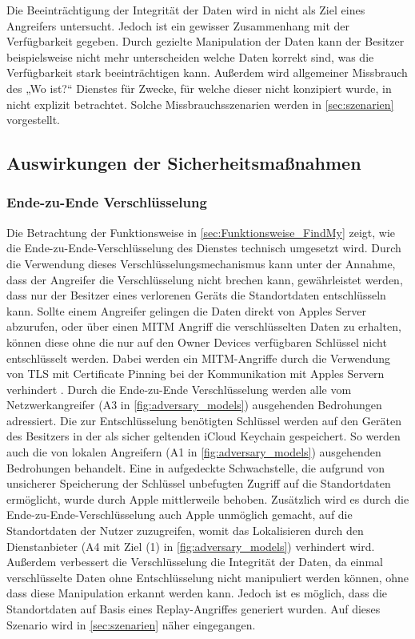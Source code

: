 Die Beeinträchtigung der Integrität der Daten wird in \cite{Heinrich_FindMy} nicht als Ziel eines Angreifers untersucht.
Jedoch ist ein gewisser Zusammenhang mit der Verfügbarkeit gegeben.
Durch gezielte Manipulation der Daten kann der Besitzer beispielsweise nicht mehr unterscheiden welche Daten korrekt sind, was die Verfügbarkeit stark beeinträchtigen kann.
Außerdem wird allgemeiner Missbrauch des „Wo ist?“ Dienstes für Zwecke, für welche dieser nicht konzipiert wurde, in \cite{Heinrich_FindMy} nicht explizit betrachtet.
Solche Missbrauchsszenarien werden in \autoref{sec:szenarien} vorgestellt.


\subsection{Auswirkungen der Sicherheitsmaßnahmen}

\subsubsection{Ende-zu-Ende Verschlüsselung}
Die Betrachtung der Funktionsweise in \autoref{sec:Funktionsweise_FindMy} zeigt, wie die Ende-zu-Ende-Verschlüsselung des Dienstes technisch umgesetzt wird.
Durch die Verwendung dieses Verschlüsselungsmechanismus kann unter der Annahme, dass der Angreifer die Verschlüsselung nicht brechen kann, gewährleistet werden, dass nur der Besitzer eines verlorenen Geräts die Standortdaten entschlüsseln kann.
Sollte einem Angreifer gelingen die Daten direkt von Apples Server abzurufen, oder über einen \ac{MITM} Angriff die verschlüsselten Daten zu erhalten, können diese ohne die nur auf den Owner Devices verfügbaren Schlüssel nicht entschlüsselt werden.
Dabei werden ein \ac{MITM}-Angriffe durch die Verwendung von \ac{TLS} mit Certificate Pinning bei der Kommunikation mit Apples Servern verhindert \cite{Heinrich_FindMy}.
Durch die Ende-zu-Ende Verschlüsselung werden alle vom Netzwerkangreifer (A3 in \autoref{fig:adversary_models}) ausgehenden Bedrohungen adressiert.
Die zur Entschlüsselung benötigten Schlüssel werden auf den Geräten des Besitzers in der als sicher geltenden iCloud Keychain gespeichert.
So werden auch die von lokalen Angreifern (A1 in \autoref{fig:adversary_models}) ausgehenden Bedrohungen behandelt.
Eine in \cite{Heinrich_FindMy} aufgedeckte Schwachstelle, die aufgrund von unsicherer Speicherung der Schlüssel unbefugten Zugriff auf die Standortdaten ermöglicht, wurde durch Apple mittlerweile behoben.
Zusätzlich wird es durch die Ende-zu-Ende-Verschlüsselung auch Apple unmöglich gemacht, auf die Standortdaten der Nutzer zuzugreifen, womit das Lokalisieren durch den Dienstanbieter (A4 mit Ziel (1) in \autoref{fig:adversary_models}) verhindert wird.
Außerdem verbessert die Verschlüsselung die Integrität der Daten, da einmal verschlüsselte Daten ohne Entschlüsselung nicht manipuliert werden können, ohne dass diese Manipulation erkannt werden kann.
Jedoch ist es möglich, dass die Standortdaten auf Basis eines Replay-Angriffes generiert wurden.
Auf dieses Szenario wird in \autoref{sec:szenarien} näher eingegangen.


